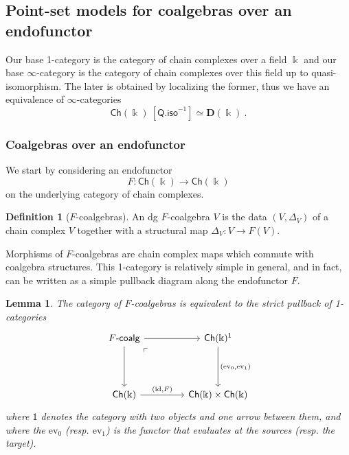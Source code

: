 \documentclass[a4paper,12pt]{amsart}
\theoremstyle{plain}
\newtheorem{lemma}[theorem]{Lemma}%
\theoremstyle{definition}
\newtheorem{definition}[theorem]{Definition}%
\theoremstyle{remark}
\newcommand{\kk}{\Bbbk}
\begin{document}
\subsection{Point-set models for coalgebras over an endofunctor}\label{Subsection: point-set models for coalgebras over endofunctors}
Our base 1-category is the category of chain complexes over a field $\kk$ and our base $\infty$-category is the category of chain complexes over this field up to quasi-isomorphism. The later is obtained by localizing the former, thus we have an equivalence of $\infty$-categories 
\[
\mathsf{Ch}(\kk)~[\mathsf{Q.iso}^{-1}] \simeq \mathbf{D}(\kk)~. 
\]

\subsubsection{Coalgebras over an endofunctor} We start by considering an endofunctor 
\[
F: \mathsf{Ch}(\kk) \longrightarrow \mathsf{Ch}(\kk)
\]
on the underlying category of chain complexes. 

\begin{definition}[$F$-coalgebras]\label{definition: coalgebras over an endofunctor}
An dg $F$-coalgebra $V$ is the data $(V,\Delta_V)$ of a chain complex $V$ together with a structural map $\Delta_V: V \longrightarrow F(V)$.
\end{definition}

Morphisms of $F$-coalgebras are chain complex maps which commute with coalgebra structures. This 1-category is relatively simple in general, and in fact, can be written as a simple pullback diagram along the endofunctor $F$. 

\begin{lemma}\label{lemma: 1-categorical coalgebras over an endofunctor as a pullback}
The category of $F$-coalgebras is equivalent to the strict pullback of 1-categories
\[
\begin{tikzcd}[column sep=3.5pc,row sep=3.5pc]
F\text{-}\mathsf{coalg} \arrow[r] \arrow[d] \arrow[dr, phantom, "\ulcorner", very near start]
& \mathsf{Ch}(\kk)^{\mathsf{1}} \arrow[d,"{(\mathrm{ev}_0,\mathrm{ev}_1)}"]  \\
 \mathsf{Ch}(\kk) \arrow[r,"{(\mathrm{id},F)}"]
& \mathsf{Ch}(\kk) \times  \mathsf{Ch}(\kk)
\end{tikzcd}
\]
where $\mathsf{1}$ denotes the category with two objects and one arrow between them, and where the $\mathrm{ev}_0$ (resp. $\mathrm{ev}_1$) is the functor that evaluates at the sources (resp. the target). 
\end{lemma} 
\end{document}
